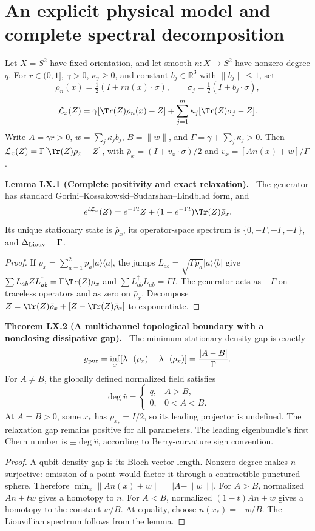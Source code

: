 \documentclass[11pt,a4paper,oneside]{book}
\newcommand{\R}{\mathbb R}\newcommand{\C}{\mathbb C}\newcommand{\Z}{\mathbb Z}\newcommand{\N}{\mathbb N}\newcommand{\Q}{\mathbb Q}
\newcommand{\statement}[3]{\par\medskip\noindent\textbf{#1 #2 (#3).}\ }
\begin{document}
\section{An explicit physical model and complete spectral decomposition}
Let $X=S^2$ have fixed orientation, and let smooth $n:X\to S^2$ have nonzero degree $q$. For $r\in(0,1]$, $\gamma>0$, $\kappa_j\ge0$, and constant $b_j\in\R^3$ with $\|b_j\|\le1$, set
\[\rho_n(x)=\tfrac12(I+rn(x)\cdot\sigma),\qquad\sigma_j=\tfrac12(I+b_j\cdot\sigma),\]
\[\mathcal L_x(Z)=\gamma[\Tr(Z)\rho_n(x)-Z]+\sum_{j=1}^m\kappa_j[\Tr(Z)\sigma_j-Z].\]
Write $A=\gamma r>0$, $w=\sum_j\kappa_jb_j$, $B=\|w\|$, and $\Gamma=\gamma+\sum_j\kappa_j>0$. Then $\mathcal L_x(Z)=\Gamma[\Tr(Z)\bar\rho_x-Z]$, with $\bar\rho_x=(I+v_x\cdot\sigma)/2$ and $v_x=[An(x)+w]/\Gamma$.
\statement{Lemma}{LX.1}{Complete positivity and exact relaxation}
The generator has standard Gorini--Kossakowski--Sudarshan--Lindblad form, and
\[e^{t\mathcal L_x}(Z)=e^{-\Gamma t}Z+(1-e^{-\Gamma t})\Tr(Z)\bar\rho_x.\]
Its unique stationary state is $\bar\rho_x$, its operator-space spectrum is $\{0,-\Gamma,-\Gamma,-\Gamma\}$, and $\Delta_{\rm Liouv}=\Gamma$.
\begin{proof}
If $\bar\rho_x=\sum_{a=1}^2p_a|a\rangle\langle a|$, the jumps $L_{ab}=\sqrt{\Gamma p_a}|a\rangle\langle b|$ give $\sum L_{ab}ZL_{ab}^\dagger=\Gamma\Tr(Z)\bar\rho_x$ and $\sum L_{ab}^\dagger L_{ab}=\Gamma I$. The generator acts as $-\Gamma$ on traceless operators and as zero on $\bar\rho_x$. Decompose $Z=\Tr(Z)\bar\rho_x+[Z-\Tr(Z)\bar\rho_x]$ to exponentiate.
\end{proof}
\statement{Theorem}{LX.2}{A multichannel topological boundary with a nonclosing dissipative gap}
The minimum stationary-density gap is exactly
\[g_{\rm pur}=\inf_x[\lambda_+(\bar\rho_x)-\lambda_-(\bar\rho_x)]=\frac{|A-B|}{\Gamma}.\]
For $A\ne B$, the globally defined normalized field satisfies
\[\deg\widehat v=\begin{cases}q,&A>B,\\0,&0<A<B.\end{cases}\]
At $A=B>0$, some $x_*$ has $\bar\rho_{x_*}=I/2$, so its leading projector is undefined. The relaxation gap remains positive for all parameters. The leading eigenbundle's first Chern number is $\pm\deg\widehat v$, according to Berry-curvature sign convention.
\begin{proof}
A qubit density gap is its Bloch-vector length. Nonzero degree makes $n$ surjective: omission of a point would factor it through a contractible punctured sphere. Therefore $\min_x\|An(x)+w\|=|A-\|w\||$. For $A>B$, normalized $An+tw$ gives a homotopy to $n$. For $A<B$, normalized $(1-t)An+w$ gives a homotopy to the constant $w/B$. At equality, choose $n(x_*)=-w/B$. The Liouvillian spectrum follows from the lemma.
\end{proof}
\end{document}
